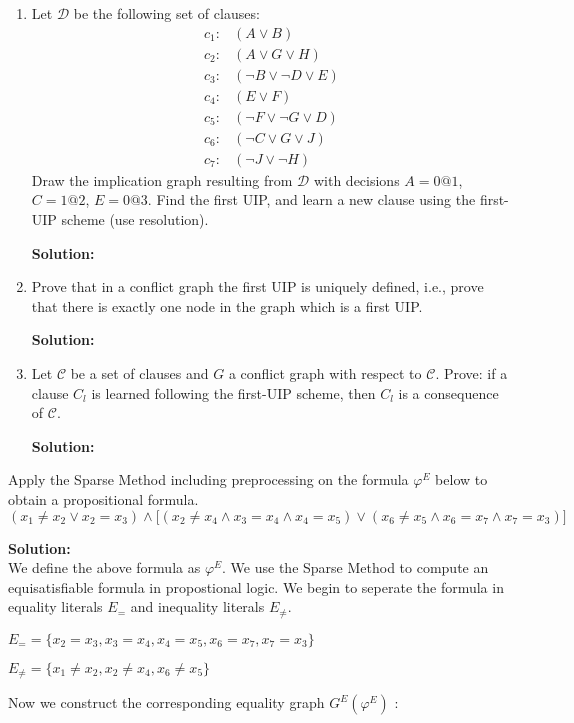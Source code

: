 \documentclass[11pt,a4paper]{uebung}
\newcommand{\solution}[1]{\par {\bf Solution:}\\#1}
\begin{document}

\newpage
{}
\begin{enumerate}
\item Let $\mathcal{D}$ be the following set of clauses:
  \begin{align*}
    c_1:& (A \lor B)\\
    c_2:& (A \lor G \lor H)\\
    c_3:& (\neg B \lor \neg D \lor E)\\
    c_4:& (E \lor F)\\
    c_5:& (\neg F \lor \neg G \lor D)\\
    c_6:& (\neg C \lor G \lor J)\\
    c_7:& (\neg J \lor \neg H)
  \end{align*}
  Draw the implication graph resulting from $\mathcal{D}$ with decisions
  $A=0@1$, $C=1@2$, $E=0@3$. Find the first UIP, and learn a new clause using
  the first-UIP scheme (use resolution).

  \solution{
  }

\item Prove that in a conflict graph the first UIP is uniquely defined, i.e.,
  prove that there is exactly one node in the graph which is a first UIP.

  \solution{
  }

\item Let $\mathcal{C}$ be a set of clauses and $G$ a conflict graph with
  respect to $\mathcal{C}$. Prove: if a clause $C_l$ is learned following the
  first-UIP scheme, then $C_l$ is a consequence of $\mathcal{C}$.

  \solution{
  }
\end{enumerate}



\newpage
{}
Apply the Sparse Method including preprocessing on the formula $\varphi^E$
below to obtain a propositional formula.
\begin{displaymath}
  (x_1 \neq x_2 \lor x_2=x_3 ) \land \big[ (x_2 \neq x_4 \land x_3=x_4
  \land x_4=x_5)
  \lor (x_6 \neq x_5 \land x_6=x_7 \land x_7=x_3)\big]
\end{displaymath}

  \solution{
We define the above formula as $\varphi^{E}$. We use the Sparse Method to compute  an equisatisfiable formula in propostional logic.
We begin to seperate the formula in equality literals $E_{=}$ and inequality literals $E_{\neq}$. 
\bigskip

$E_{=} = \{x_2 = x_3, x_3 = x_4 , x_4 = x_5 , x_6 = x_7, x_7 =x_3 \}$

\bigskip

$E_{\neq} =\{x_1 \neq x_2, x_2 \neq x_4 , x_6 \neq x_5 \} $

Now we construct the corresponding equality graph $G^{E} (\varphi^{E} )$ :


  }
\end{document}
